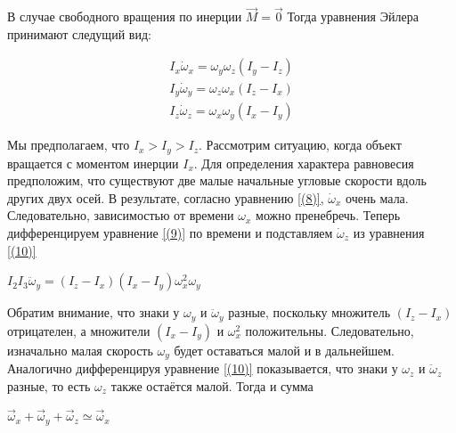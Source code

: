 \documentclass{article}
\begin{document}
В случае свободного вращения по инерции $\vec{M} = \vec{0}$
Тогда уравнения Эйлера принимают следущий вид:

\begin{equation} 
\begin{gathered}
\label{(8)}
I_x{\displaystyle {\dot {\omega }}_{x}} = \omega_y\omega_z(I_y - I_z)
\end{gathered}
\end{equation}
\begin{equation} 
\begin{gathered}
\label{(9)}
I_y{\displaystyle {\dot {\omega }}_{y}} = \omega_z\omega_x(I_z - I_x) 
\end{gathered}
\end{equation}
\begin{equation} 
\begin{gathered}
\label{(10)}
I_z{\displaystyle {\dot {\omega }}_{z}} = \omega_x\omega_y(I_x - I_y)
\end{gathered}
\end{equation}

Мы предполагаем, что $I_x > I_y > I_z$. 
Рассмотрим ситуацию, когда объект вращается с моментом инерции $I_x$. Для определения характера равновесия предположим, что существуют две малые начальные угловые скорости вдоль других двух осей. В результате, согласно уравнению \ref{(8)}, $\displaystyle {\dot {\omega }}_{x}$ очень мала. Следовательно, зависимостью от времени $\omega_x$ можно пренебречь. Теперь дифференцируем уравнение \ref{(9)} по времени и подставляем $\displaystyle {\dot {\omega }}_{z}$ из уравнения \ref{(10)}

\begin{center}
$I_2I_3\displaystyle {\ddot {\omega }}_{y} = (I_z - I_x)(I_x - I_y)\omega_x^2\omega_y$
\end{center}

Обратим внимание, что знаки у $\omega_y$ и $\displaystyle {\ddot {\omega }}_{y}$ разные, поскольку множитель $(I_z - I_x)$ отрицателен, а множители $(I_x - I_y)$ и $\omega_x^2$ положительны. Следовательно, изначально малая скорость $\omega_y$ будет оставаться малой и в дальнейшем. Аналогично дифференцируя уравнение \ref{(10)} показывается, что знаки у $\omega_z$ и $\displaystyle {\ddot {\omega }}_{z}$ разные, то есть $\omega_z$ также остаётся малой. Тогда и сумма 

\begin{center}
$\vec{\omega}_x + \vec{\omega}_y + \vec{\omega}_z \simeq \vec{\omega}_x$ 
\end{center}
\end{document}
